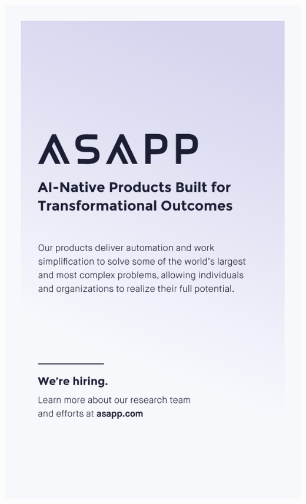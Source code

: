 \thispagestyle{empty}
\begin{center}
  \vfill
  \includegraphics[width=\textwidth]{content/ads/full/asapp.pdf}
  \vfill
\end{center}

